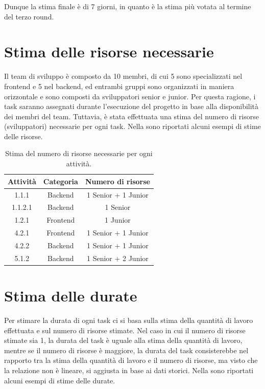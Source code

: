 \documentclass[a4paper,12pt]{article}
\begin{document}
Dunque la stima finale è di 7 giorni, in quanto è la stima più votata al termine del terzo round.

\section{Stima delle risorse necessarie}
Il team di sviluppo è composto da 10 membri, di cui 5 sono specializzati nel frontend e 5 nel backend, ed entrambi 
gruppi sono organizzati in maniera orizzontale e sono composti da sviluppatori senior e junior. Per questa ragione, i
task saranno assegnati durante l'esecuzione del progetto in base alla disponibilità dei membri del team. Tuttavia, è
stata effettuata una stima del numero di risorse (sviluppatori) necessarie per ogni task.
Nella  sono riportati alcuni esempi di stime delle risorse.

\begin{table}[!htb]
    \centering
    \begin{tabular}{|c|c|c|}
        \hline
        \textbf{Attività} & \textbf{Categoria} & \textbf{Numero di risorse} \\
        \hline
        1.1.1   & Backend  & 1 Senior + 1 Junior  \\
        \hline
        1.1.2.1 & Backend  & 1 Senior  \\
        \hline
        1.2.1   & Frontend & 1 Junior  \\
        \hline
        4.2.1   & Frontend & 1 Senior + 1 Junior  \\
        \hline
        4.2.2   & Backend  & 1 Senior + 1 Junior  \\
        \hline
        5.1.2   & Backend  & 1 Senior + 2 Junior  \\
        \hline
    \end{tabular}
    \caption{Stima del numero di risorse necessarie per ogni attività.}
    \label{table:resources_estimated}
\end{table}

\section{Stima delle durate}
Per stimare la durata di ogni task ci si basa sulla stima della quantità di lavoro effettuata e sul numero di risorse
stimate. Nel caso in cui il numero di risorse stimate sia 1, la durata del task è uguale alla stima della quantità di
lavoro, mentre se il numero di risorse è maggiore, la durata del task consisterebbe nel rapporto tra la stima della
quantità di lavoro e il numero di risorse, ma visto che la relazione non è lineare, si aggiusta in base ai dati storici.
Nella  sono riportati alcuni esempi di stime delle durate.
\end{document}
